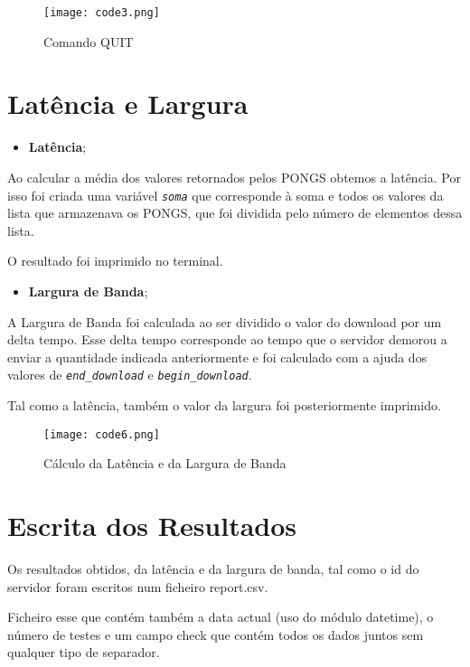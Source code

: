 \documentclass{report}
\begin{document}
\begin{figure}[h]
\center %
\texttt{[image: code3.png]}
\caption{Comando QUIT}
\label{fig:code3}
\end{figure}

\section{Latência e Largura}

\begin{itemize}
\item \textbf{Latência};
\end{itemize}

Ao calcular a média dos valores retornados pelos PONGS obtemos a latência. Por isso foi criada uma variável {\itshape \texttt{soma}} que corresponde à soma e todos os valores da lista que armazenava os PONGS, que foi dividida pelo número de elementos dessa lista.

O resultado foi imprimido no terminal.

\begin{itemize}
\item \textbf{Largura de Banda};
\end{itemize}
A Largura de Banda foi calculada ao ser dividido o valor do download por um delta tempo. Esse delta tempo corresponde ao tempo que o servidor demorou a enviar a quantidade indicada anteriormente e foi calculado com a ajuda dos valores de {\itshape \texttt{end\_download}} e {\itshape \texttt{begin\_download}}.

Tal como a latência, também o valor da largura foi posteriormente imprimido.


\begin{figure}[h]
\center %
\texttt{[image: code6.png]}
\caption{Cálculo da Latência e da Largura de Banda}
\label{fig:code6}
\end{figure}



\section{Escrita dos Resultados}
Os resultados obtidos, da latência e da largura de banda, tal como o id do servidor foram escritos num ficheiro report.csv.
    
Ficheiro esse que contém também a data actual (uso do módulo datetime), o número de testes e um campo check que contém todos os dados juntos sem qualquer tipo de separador.
\end{document}
